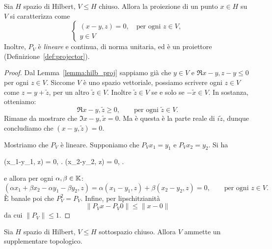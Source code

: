 \begin{theorem}
\label{th:hilb_projector_subspace}
	Sia $H$ spazio di Hilbert, $V \leq H$ chiuso.
	Allora la proiezione di un punto $x \in H$ su $V$ si caratterizza come
	\begin{equation*}
		\begin{cases}
			(x-y,z) = 0, \quad \text{per ogni $z \in V$},\\
			y \in V
		\end{cases}
	\end{equation*}
	Inoltre, $P_V$ è \emph{lineare} e continua, di norma unitaria, ed è un proiettore (Definizione~\ref{def:projector}).
\end{theorem}
\begin{proof}
	Dal Lemma~\ref{lemma:hilb_proj} sappiamo già che $y \in V$ e $\Re{x-y,z-y} \leq 0$ per ogni $z \in V$. Siccome $V$ è uno spazio vettoriale, possiamo scrivere ogni $z \in V$ come $z = y + \tilde z$, per un altro $\tilde z \in V$. Inoltre $\tilde z \in V$ se e solo se $-\tilde x \in V$. In sostanza, otteniamo:
	\begin{equation*}
		\Re{x-y, \tilde z} \geq 0, \qquad \text{per ogni $\tilde z \in V$}.
	\end{equation*}
	Rimane da mostrare che $\Im{x-y,\tilde x} = 0$. Ma è questa è la parte reale di $i \tilde z$, dunque concludiamo che $(x-y, \tilde z) = 0$.

	Mostriamo che $P_V$ è lineare. Supponiamo che $P_Vx_1 = y_1$ e $P_V x_2 = y_2$. Si ha
	\begin{eqalign*}
		(x_1-y_1, z) = 0, \qquad {}.
		(x_2-y_2, z) = 0, \qquad {}.
	\end{eqalign*}
	e allora per ogni $\alpha, \beta \in \mathbb{K}$:
	\begin{equation*}
		(\alpha x_1 + \beta x_2 - \alpha y_1 - \beta y_2, z) = \alpha (x_1 -y_1, z) + \beta (x_2-y_2, z) = 0, \qquad \text{per ogni $z \in V$}.
	\end{equation*}
	È banale poi che $P_V^2 =P_V$. Infine, per lipschitzianità
	\begin{equation*}
		\|P_V x - P_V 0 \| \leq \|x -0\|
	\end{equation*}
	da cui $\|P_V\| \leq 1$.
\end{proof}
\begin{corollary}
	Sia $H$ spazio di Hilbert, $V \leq H$ sottospazio chiuso.
	Allora $V$ ammette un supplementare topologico.
\end{corollary}

